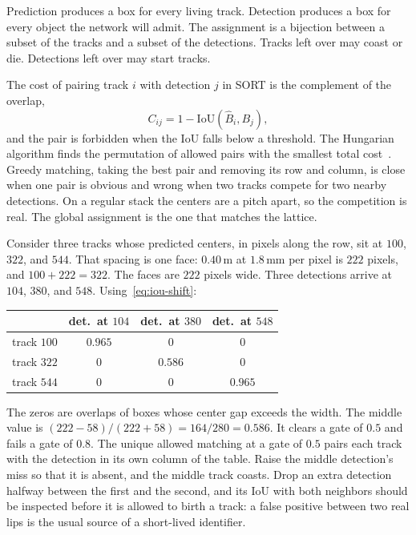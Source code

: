 \documentclass[11pt,a4paper]{article}
\begin{document}
Prediction produces a box for every living track. Detection produces a box for every object the network will admit. The assignment is a bijection between a subset of the tracks and a subset of the detections. Tracks left over may coast or die. Detections left over may start tracks.

The cost of pairing track $i$ with detection $j$ in SORT is the complement of the overlap,
\begin{equation}
C_{ij} = 1 - \mathrm{IoU}(\hat{B}_i, B_j),
\label{eq:cost}
\end{equation}
and the pair is forbidden when the IoU falls below a threshold. The Hungarian algorithm finds the permutation of allowed pairs with the smallest total cost~\cite{kuhn1955hungarian}. Greedy matching, taking the best pair and removing its row and column, is close when one pair is obvious and wrong when two tracks compete for two nearby detections. On a regular stack the centers are a pitch apart, so the competition is real. The global assignment is the one that matches the lattice.

Consider three tracks whose predicted centers, in pixels along the row, sit at $100$, $322$, and $544$. That spacing is one face: $0.40\,\mathrm{m}$ at $1.8\,\mathrm{mm}$ per pixel is $222$ pixels, and $100+222=322$. The faces are $222$ pixels wide. Three detections arrive at $104$, $380$, and $548$. Using~\eqref{eq:iou-shift}:

\begin{center}
\begin{tabular}{lccc}
\toprule
 & det.\ at $104$ & det.\ at $380$ & det.\ at $548$ \\
\midrule
track $100$ & $0.965$ & $0$ & $0$ \\
track $322$ & $0$ & $0.586$ & $0$ \\
track $544$ & $0$ & $0$ & $0.965$ \\
\bottomrule
\end{tabular}
\end{center}

The zeros are overlaps of boxes whose center gap exceeds the width. The middle value is $(222-58)/(222+58)=164/280=0.586$. It clears a gate of $0.5$ and fails a gate of $0.8$. The unique allowed matching at a gate of $0.5$ pairs each track with the detection in its own column of the table. Raise the middle detection's miss so that it is absent, and the middle track coasts. Drop an extra detection halfway between the first and the second, and its IoU with both neighbors should be inspected before it is allowed to birth a track: a false positive between two real lips is the usual source of a short-lived identifier.
\end{document}
